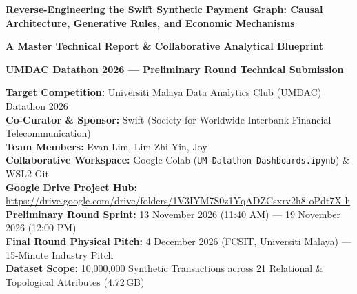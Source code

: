 \documentclass[11pt,a4paper]{article}
\begin{document}
\begin{titlepage}
\begin{center}
    \vspace*{0.2cm}
    {\fontsize{20.74}{26}\selectfont \textbf{\color{SwiftNavy} Reverse-Engineering the Swift Synthetic Payment Graph: Causal Architecture, Generative Rules, and Economic Mechanisms}\par}\vspace{0.4cm}
    {\Large \textbf{\color{SwiftSky} A Master Technical Report \& Collaborative Analytical Blueprint}\par}\vspace{0.2cm}
    {\normalsize \textbf{UMDAC Datathon 2026 --- Preliminary Round Technical Submission}\par}\vspace{0.8cm}
    
    \begin{tcolorbox}[colback=SwiftLight, colframe=SwiftNavy, width=0.94\textwidth, arc=2mm]
    \centering\small
    \textbf{Target Competition:} Universiti Malaya Data Analytics Club (UMDAC) Datathon 2026\\
    \textbf{Co-Curator \& Sponsor:} Swift (Society for Worldwide Interbank Financial Telecommunication)\\
    \textbf{Team Members:} Evan Lim, Lim Zhi Yin, Joy\\
    \textbf{Collaborative Workspace:} Google Colab (\texttt{UM Datathon Dashboards.ipynb}) \& WSL2 Git\\
    \textbf{Google Drive Project Hub:} \url{https://drive.google.com/drive/folders/1V3IYM7S0z1YqADZCsxrv2h8-oPdt7X-h}\\
    \textbf{Preliminary Round Sprint:} 13 November 2026 (11:40 AM) --- 19 November 2026 (12:00 PM)\\
    \textbf{Final Round Physical Pitch:} 4 December 2026 (FCSIT, Universiti Malaya) --- 15-Minute Industry Pitch\\
    \textbf{Dataset Scope:} 10,000,000 Synthetic Transactions across 21 Relational \& Topological Attributes (4.72\,GB)
    \end{tcolorbox}
    
    \vspace{0.6cm}
    

\end{center}
\end{titlepage}
\end{document}
